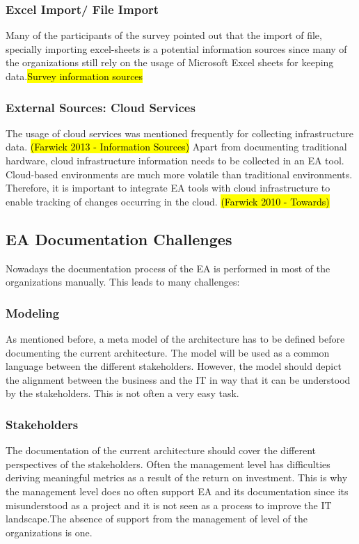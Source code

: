 \subsubsection{Excel Import/ File Import}
Many of the participants of the survey pointed out that the import of file, specially importing excel-sheets is a potential information sources since many of the organizations still rely on the usage of Microsoft Excel sheets for keeping data.\hl{Survey information sources}

\subsubsection{External Sources: Cloud Services}

The usage of cloud services was mentioned frequently for collecting infrastructure data. \hl{(Farwick 2013 - Information Sources)} Apart from documenting traditional hardware, cloud infrastructure information needs to be collected in an EA tool. Cloud-based environments are much more volatile than traditional environments. Therefore, it is important to integrate EA tools with cloud infrastructure to enable tracking of changes occurring in the cloud. \hl{(Farwick 2010 - Towards)}


\subsection{EA Documentation Challenges}

Nowadays the documentation process of the EA is performed in most of the organizations manually. This leads to many challenges:

\subsubsection{Modeling}
As mentioned before, a meta model of the architecture has to be defined before documenting the current architecture. The model will be used as a common language between the different stakeholders. However, the model should depict the alignment between the business and the IT in way that it can be understood by the stakeholders. This is not often a very easy task.

\subsubsection{Stakeholders}
The documentation of the current architecture should cover the different perspectives of the stakeholders. Often the management level has difficulties deriving meaningful metrics as a result of the return on investment. This is why the management level does no often support EA and its documentation since its misunderstood as a project and it is not seen as a process to improve the IT landscape.The absence of support from the management of level of the organizations is one.

